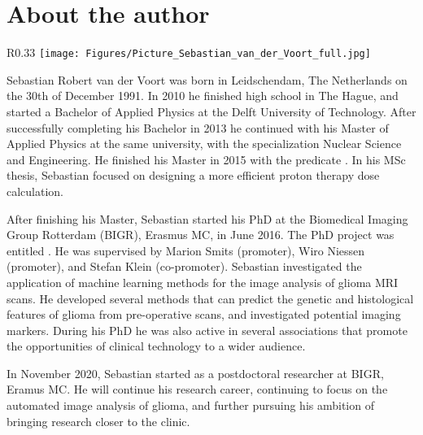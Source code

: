 \chapter{About the author}

\begin{wrapfigure}{R}{0.33\textwidth}
    \centering
    \texttt{[image: Figures/Picture\_Sebastian\_van\_der\_Voort\_full.jpg]}
\end{wrapfigure}


Sebastian Robert van der Voort was born in Leidschendam, The Netherlands on the 30th of December 1991.
In 2010 he finished high school in The Hague, and started a Bachelor of Applied Physics at the Delft University of Technology.
After successfully completing his Bachelor in 2013 he continued with his Master of Applied Physics at the same university, with the specialization Nuclear Science and Engineering.
He finished his Master in 2015 with the predicate .
In his MSc thesis, Sebastian focused on designing a more efficient proton therapy dose calculation.

\vspace{\baselineskip}
\noindent After finishing his Master, Sebastian started his PhD at the Biomedical Imaging Group Rotterdam (BIGR), Erasmus MC, in June 2016.
The PhD project was entitled .
He was supervised by Marion Smits (promoter), Wiro Niessen (promoter), and Stefan Klein (co-promoter).
Sebastian investigated the application of machine learning methods for the image analysis of glioma MRI scans.
He developed several methods that can predict the genetic and histological features of glioma from pre-operative scans, and investigated potential imaging markers.
During his PhD he was also active in several associations that promote the opportunities of clinical technology to a wider audience.

\vspace{\baselineskip}
\noindent In November 2020, Sebastian started as a postdoctoral researcher at BIGR, Eramus MC.
He will continue his research career, continuing to focus on the automated image analysis of glioma, and further pursuing his ambition of bringing research closer to the clinic.

